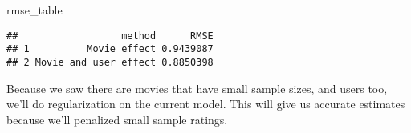 \documentclass[]{article}
\newenvironment{Shaded}{\begin{snugshade}}{\end{snugshade}}
\newcommand{\KeywordTok}[1]{\textcolor[rgb]{0.13,0.29,0.53}{\textbf{#1}}}
\newcommand{\DataTypeTok}[1]{\textcolor[rgb]{0.13,0.29,0.53}{#1}}
\newcommand{\DecValTok}[1]{\textcolor[rgb]{0.00,0.00,0.81}{#1}}
\newcommand{\FloatTok}[1]{\textcolor[rgb]{0.00,0.00,0.81}{#1}}
\newcommand{\StringTok}[1]{\textcolor[rgb]{0.31,0.60,0.02}{#1}}
\newcommand{\ControlFlowTok}[1]{\textcolor[rgb]{0.13,0.29,0.53}{\textbf{#1}}}
\newcommand{\OperatorTok}[1]{\textcolor[rgb]{0.81,0.36,0.00}{\textbf{#1}}}
\newcommand{\NormalTok}[1]{#1}
\begin{document}
\begin{Shaded}
\begin{Highlighting}[]
\NormalTok{rmse_table}
\end{Highlighting}
\end{Shaded}

\begin{verbatim}
##                  method      RMSE
## 1          Movie effect 0.9439087
## 2 Movie and user effect 0.8850398
\end{verbatim}

Because we saw there are movies that have small sample sizes, and users
too, we'll do regularization on the current model. This will give us
accurate estimates because we'll penalized small sample ratings.

\begin{Shaded}
\end{Shaded}
\end{document}

